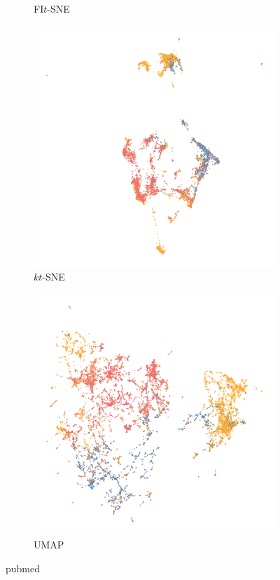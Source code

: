 \begin{appendix}
\begin{figure}[tbp]
\begin{subfigure}{0.45\linewidth}
    \caption{FI$t$-SNE}
\end{subfigure}
\par\bigskip
\begin{subfigure}{0.45\linewidth}
  \centering
    \includegraphics[width=\linewidth]{img/emb/ktsne_pubmed}
    \caption{$kt$-SNE}
\end{subfigure}
  \begin{subfigure}{0.45\linewidth}
    \centering
    \includegraphics[width=\linewidth]{img/emb/umap_pubmed}
    \caption{UMAP}
  \end{subfigure}
  \caption{pubmed}
\end{figure}


\end{appendix}
